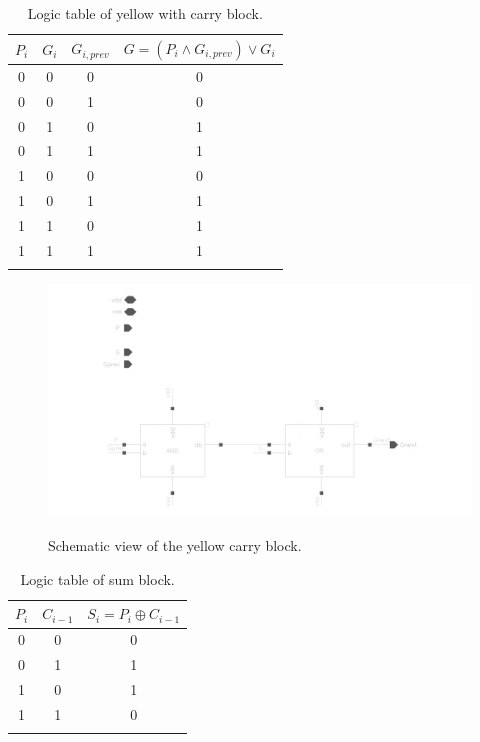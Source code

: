 \begin{table}[H]
  \caption{Logic table of yellow with carry block.}
  \centering
  \begin{tabular}{ccc|c}
    \toprule
    $P_i$ & $G_i$ & $G_{i,prev}$ & $G=(P_i \wedge G_{i,prev}) \vee G_i$  \\
    \midrule
    0 & 0 & 0 & 0 \\
    0 & 0 & 1 & 0 \\
    0 & 1 & 0 & 1 \\
    0 & 1 & 1 & 1 \\
    1 & 0 & 0 & 0 \\
    1 & 0 & 1 & 1 \\
    1 & 1 & 0 & 1 \\
    1 & 1 & 1 & 1 \\
    \bottomrule
    \label{tab:yellowcarry}
  \end{tabular}
\end{table}

\begin{figure}[H]
  \centering
  \captionsetup{justification=centering}
  {\includegraphics[width=1.2\textwidth]{../figures/yellow_carry}}
  \caption{Schematic view of the yellow carry block.} \label{fig:yellow_c}
\end{figure}

\begin{table}[H]
  \caption{Logic table of sum block.}
  \centering
  \begin{tabular}{cc|c}
    \toprule
    $P_i$ & $C_{i-1}$ & $S_i=P_i \oplus C_{i-1}$ \\
    \midrule
    0 & 0 & 0 \\
    0 & 1 & 1 \\
    1 & 0 & 1 \\
    1 & 1 & 0 \\
    \bottomrule
    \label{tab:sum}
  \end{tabular}
\end{table}

